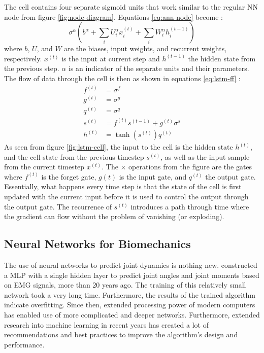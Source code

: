 \documentclass[../main.tex]{subfiles}
\begin{document}
The cell contains four separate sigmoid units that work similar to the regular \ac{NN} node from figure \ref{fig:node-diagram}.
Equations \ref{eq:ann-node} become \cite{Goodfellow2016}:
\begin{equation}
\label{eq:lstm_sigmoid_generic}
    \sigma^{\alpha}\left(b^{\alpha} + \sum_i{U_i^{\alpha} x_i^{(t)}} + \sum_i{W_i^{\alpha} h_i^{(t-1)}} \right)
\end{equation}
where $b$, $U$, and $W$ are the biases, input weights, and recurrent weights, respectively.
$x^(t)$ is the input at current step and $h^(t-1)$ the hidden state from the previous step.
$\alpha$ is an indicator of the separate units and their parameters.
The flow of data through the cell is then as shown in equations \ref{eq:lstm-ff} \cite{Goodfellow2016}:
\begin{subequations}
\label{eq:lstm-ff}
\begin{align}
    f^{(t)} &= \sigma^f\\
    g^{(t)} &= \sigma^g\\
    q^{(t)} &= \sigma^q\\
    s^{(t)} &= f^{(t)}s^{(t-1)} + g^{(t)}\sigma^s\\
    h^{(t)} &= \tanh\left(s^{(t)}\right)q^{(t)} \label{eq:last_lstm_step}
\end{align}
\end{subequations}
As seen from figure \ref{fig:lstm-cell}, the input to the cell is the hidden state $h^{(t)}$, and the cell state from the previous timestep $s^{(t)}$, as well as the input sample from the current timestep $x^{(t)}$.
The $\times$ operations from the figure are the gates where $f^{(t)}$ is the forget gate, $g{(t)}$ is the input gate, and $q^{(t)}$ the output gate.
Essentially, what happens every time step is that the state of the cell is first updated with the current input before it is used to control the output through the output gate.
The recurrence of $s^{(t)}$ introduces a path through time where the gradient can flow without the problem of vanishing (or exploding).




\subsection{Neural Networks for Biomechanics}
The use of neural networks to predict joint dynamics is nothing new.
\textcite{Sepulveda1993} constructed a \ac{MLP} with a single hidden layer to predict joint angles and joint moments based on EMG signals, more than 20 years ago. 
The training of this relatively small network took a very long time.
Furthermore, the results of the trained algorithm indicate overfitting.
Since then, extended processing power of modern computers has enabled use of more complicated and deeper networks.
Furthermore, extended research into machine learning in recent years has created a lot of recommendations and best practices to improve the algorithm's design and performance.
\end{document}
